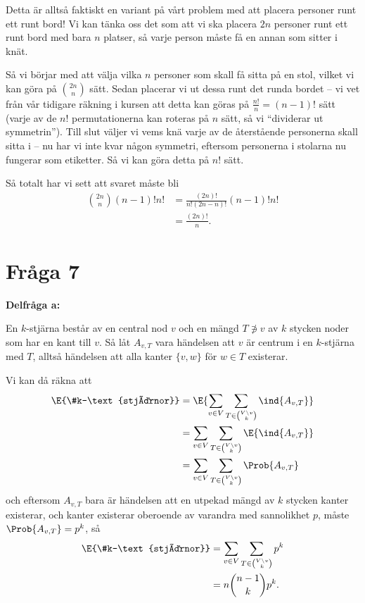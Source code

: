 \documentclass[nobib]{tufte-handout}
\begin{document}
Detta är alltså faktiskt en variant på vårt problem med att placera personer runt ett runt bord! Vi kan tänka oss det som att vi ska placera $2n$ personer runt ett runt bord med bara $n$ platser, så varje person måste få en annan som sitter i knät.

Så vi börjar med att välja vilka $n$ personer som skall få sitta på en stol, vilket vi kan göra på $\binom{2n}{n}$ sätt. Sedan placerar vi ut dessa runt det runda bordet -- vi vet från vår tidigare räkning i kursen att detta kan göras på $\frac{n!}{n} = (n-1)!$ sätt (varje av de $n!$ permutationerna kan roteras på $n$ sätt, så vi ``dividerar ut symmetrin''). Till slut väljer vi vems knä varje av de återstående personerna skall sitta i -- nu har vi inte kvar någon symmetri, eftersom personerna i stolarna nu fungerar som etiketter. Så vi kan göra detta på $n!$ sätt.

Så totalt har vi sett att svaret måste bli 
\begin{align*}
  \binom{2n}{n}(n-1)!n! &= \frac{(2n)!}{n!(2n-n)!}(n-1)!n!\\
  &= \frac{(2n)!}{n}.
\end{align*}

\section{Fråga 7}

\noindent\textbf{Delfråga a:}

En $k$-stjärna består av en central nod $v$ och en mängd $T\not\ni v$ av $k$ stycken noder som har en kant till $v$. Så låt $A_{v, T}$ vara händelsen att $v$ är centrum i en $k$-stjärna med $T$, alltså händelsen att alla kanter $\{v,w\}$ för $w\in T$ existerar.

Vi kan då räkna att
\begin{align*}
  \E{\#k-\text{stjärnor}} &= \E{\sum_{v\in V}\sum_{T \in \binom{V\setminus v}{k}} \ind{A_{v,T}}}\\
  &= \sum_{v\in V}\sum_{T \in \binom{V\setminus v}{k}} \E{\ind{A_{v,T}}}\\
  &= \sum_{v\in V}\sum_{T \in \binom{V\setminus v}{k}} \Prob{A_{v,T}}
\end{align*}
och eftersom $A_{v,T}$ bara är händelsen att en utpekad mängd av $k$ stycken kanter existerar, och kanter existerar oberoende av varandra med sannolikhet $p$, måste $\Prob{A_{v,T}} = p^k$, så
\begin{align*}
  \E{\#k-\text{stjärnor}} &= \sum_{v\in V}\sum_{T \in \binom{V\setminus v}{k}} p^k\\
  &= n\binom{n-1}{k}p^k.
\end{align*}
\end{document}
